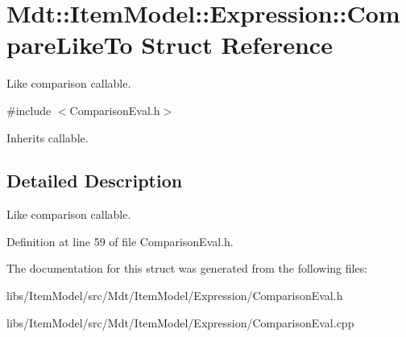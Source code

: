 \hypertarget{struct_mdt_1_1_item_model_1_1_expression_1_1_compare_like_to}{}\section{Mdt\+:\+:Item\+Model\+:\+:Expression\+:\+:Compare\+Like\+To Struct Reference}
\label{struct_mdt_1_1_item_model_1_1_expression_1_1_compare_like_to}


Like comparison callable.  




{\ttfamily \#include $<$Comparison\+Eval.\+h$>$}



Inherits callable.



\subsection{Detailed Description}
Like comparison callable. 

Definition at line 59 of file Comparison\+Eval.\+h.



The documentation for this struct was generated from the following files\+:\begin{DoxyCompactItemize}
\item 
libs/\+Item\+Model/src/\+Mdt/\+Item\+Model/\+Expression/Comparison\+Eval.\+h\item 
libs/\+Item\+Model/src/\+Mdt/\+Item\+Model/\+Expression/Comparison\+Eval.\+cpp\end{DoxyCompactItemize}
